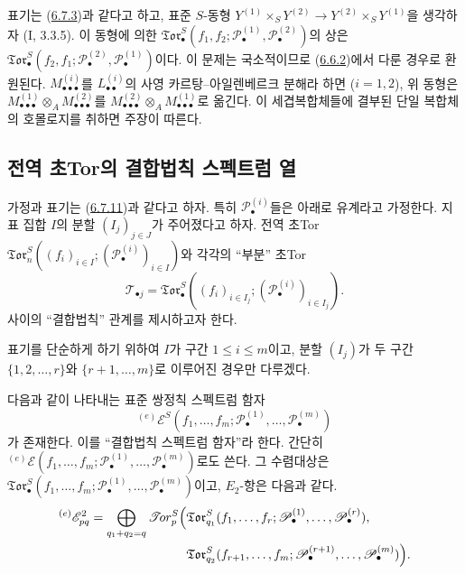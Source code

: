 \begin{remark}[6.7.13]
\label{III.6.7.13-fr}
표기는 (\hyperref[III.6.7.3-fr]{6.7.3})과 같다고 하고, 표준
$S$-동형
$Y^{(1)}\times_S Y^{(2)}\to Y^{(2)}\times_S Y^{(1)}$을 생각하자
(I, 3.3.5). 이 동형에 의한
$\mathfrak{Tor}_\bullet^S(f_1,f_2;
\mathscr P_\bullet^{(1)},\mathscr P_\bullet^{(2)})$의 상은
$\mathfrak{Tor}_\bullet^S(f_2,f_1;
\mathscr P_\bullet^{(2)},\mathscr P_\bullet^{(1)})$이다. 이 문제는
국소적이므로 (\hyperref[III.6.6.2-fr]{6.6.2})에서 다룬 경우로
환원된다. $M_{\bullet\bullet\bullet}^{(i)}$를
$L_{\bullet\bullet}^{(i)}$의 사영 카르탕--아일렌베르크 분해라
하면 ($i=1,2$), 위 동형은
$M_{\bullet\bullet\bullet}^{(1)}\otimes_A
M_{\bullet\bullet\bullet}^{(2)}$를
$M_{\bullet\bullet\bullet}^{(2)}\otimes_A
M_{\bullet\bullet\bullet}^{(1)}$로 옮긴다. 이 세겹복합체들에 결부된
단일 복합체의 호몰로지를 취하면 주장이 따른다.
\end{remark}

\subsection{전역 초Tor의 결합법칙 스펙트럼 열}
\label{subsection:III.6.8.fr}

\begin{env}[6.8.1]
\label{III.6.8.1-fr}
가정과 표기는 (\hyperref[III.6.7.11-fr]{6.7.11})과 같다고 하자.
특히 $\mathscr P_\bullet^{(i)}$들은 아래로 유계라고 가정한다.
지표 집합 $I$의 분할 $(I_j)_{j\in J}$가 주어졌다고 하자. 전역 초Tor
$\mathfrak{Tor}_n^S((f_i)_{i\in I};
(\mathscr P_\bullet^{(i)})_{i\in I})$와 각각의 “부분” 초Tor
\[
  \mathcal T_{\bullet j}
  =\mathfrak{Tor}_\bullet^S
  ((f_i)_{i\in I_j};(\mathscr P_\bullet^{(i)})_{i\in I_j}).
\]
사이의 “결합법칙” 관계를 제시하고자 한다.


표기를 단순하게 하기 위하여 $I$가 구간 $1\leq i\leq m$이고, 분할
$(I_j)$가 두 구간 $\{1,2,\ldots,r\}$와
$\{r+1,\ldots,m\}$로 이루어진 경우만 다루겠다.
\end{env}

\begin{proposition}[6.8.2]
\label{III.6.8.2-fr}
다음과 같이 나타내는 표준 쌍정칙 스펙트럼 함자
\[
  {}^{(e)}\mathscr E^S
  (f_1,\ldots,f_m;
   \mathscr P_\bullet^{(1)},\ldots,\mathscr P_\bullet^{(m)})
\]
가 존재한다. 이를 “결합법칙 스펙트럼 함자”라 한다. 간단히
$ {}^{(e)}\mathscr E(f_1,\ldots,f_m;
\mathscr P_\bullet^{(1)},\ldots,\mathscr P_\bullet^{(m)})$로도 쓴다.
그 수렴대상은
$\mathfrak{Tor}_\bullet^S(f_1,\ldots,f_m;
\mathscr P_\bullet^{(1)},\ldots,\mathscr P_\bullet^{(m)})$이고,
$E_2$-항은 다음과 같다.
\[
\begin{split}
  {}^{(e)}\mathscr E_{pq}^2
  =\bigoplus_{q_1+q_2=q}
  \mathscr{T}\!or_p^S\Bigl(
  &\mathfrak{Tor}_{q_1}^S
  (f_1,\ldots,f_r;
   \mathscr P_\bullet^{(1)},\ldots,\mathscr P_\bullet^{(r)}),\\
  &\mathfrak{Tor}_{q_2}^S
  (f_{r+1},\ldots,f_m;
   \mathscr P_\bullet^{(r+1)},\ldots,\mathscr P_\bullet^{(m)})
  \Bigr).
\end{split}
\]
\end{proposition}

